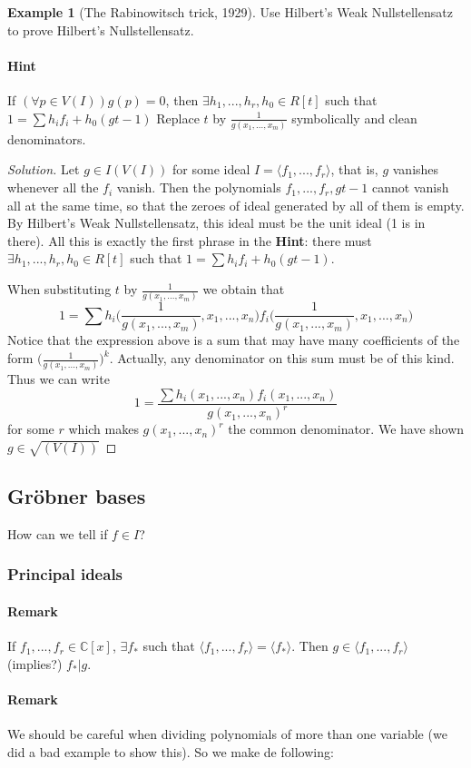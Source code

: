 \documentclass{article}
\theoremstyle{definition}
\newtheorem{ex}{Example}
\newcommand{\C}{\mathbb{C}}
\begin{document}
\begin{ex}[The Rabinowitsch trick, 1929]
	Use Hilbert's Weak Nullstellensatz to prove Hilbert's Nullstellensatz.
	\paragraph{Hint} If $(\forall p\in V(I))g(p)=0$, then $\exists h_1,...,h_r,h_0\in R[t]$ such that $1=\sum h_i f_i+h_0(gt-1)$ Replace $t$ by $\frac{1}{g(x_1,...,x_m)}$ symbolically and clean denominators.
	\begin{proof}[Solution] Let $g\in I(V(I))$ for some ideal $I=\langle f_1,...,f_r\rangle$, that is, $g$ vanishes whenever all the $f_i$ vanish. Then the polynomials $f_1,...,f_r,gt-1$ cannot vanish all at the same time, so that the zeroes of ideal generated by all of them is empty. By Hilbert's Weak Nullstellensatz, this ideal must be the unit ideal (1 is in there). All this is exactly the first phrase in the \textbf{Hint}: there must $\exists h_1,...,h_r,h_0\in R[t]$ such that $1=\sum h_i f_i+h_0(gt-1)$.\par
	When substituting $t$ by $\frac{1}{g(x_1,...,x_m)}$ we obtain that $$1=\sum h_i\Big(\frac{1}{g(x_1,...,x_m)},x_1,...,x_n\Big)f_i\Big(\frac{1}{g(x_1,...,x_m)},x_1,...,x_n\Big)$$
	Notice that the expression above is a sum that may have many coefficients of the form $\Big(\frac{1}{g(x_1,...,x_m)}\Big)^k$. Actually, any denominator on this sum must be of this kind. Thus we can write
	$$
	1=\frac{\sum h_i(x_1,...,x_n)f_i(x_1,...,x_n)}{g(x_1,...,x_n)^r}
	$$
	for some $r$ which makes $g(x_1,...,x_n)^r$ the common denominator. We have shown $g\in \sqrt{(V(I))}$
	\end{proof}
\end{ex}
\subsection{Gröbner bases}
How can we tell if $f\in I$?
\subsubsection{Principal ideals}
\paragraph{Remark}If $f_1,...,f_r\in\C[x]$, $\exists f_*$ such that $\langle f_1,...,f_r\rangle=\langle f_*\rangle$. Then $g\in\langle f_1,...,f_r\rangle$ (implies?) $f_*|g$.
\paragraph{Remark} We should be careful when dividing polynomials of more than one variable (we did a bad example to show this). So we make de following:
\end{document}
